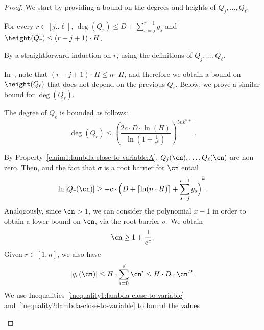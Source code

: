 \begin{proof}
    We start by providing a bound on the degrees and heights
    of $Q_j,\dots,Q_\ell$:
    \begin{claim}\label{claim2:lambda-close-to-variable}
      For every $r \in [j..\ell]$,
      $\deg(Q_r) \leq D + \sum_{s=j}^{r-1} g_s$
      and $\height(Q_r) \leq (r-j+1) \cdot H$.
    \end{claim}
    \begin{claimproof}
      By a straightforward induction on $r$, using the definitions of
      $Q_j,\dots,Q_\ell$.
    \end{claimproof}
    In~,
    note that $(r-j+1) \cdot H \leq n \cdot H$, and therefore we obtain a bound on $\height(Q_\ell)$ that does not depend on the previous $Q_r$. 
    Below, we prove a similar bound for $\deg(Q_\ell)$. 
      \begin{claim}\label{claim3:lambda-close-to-variable}
        The degree of $Q_\ell$ is bounded as follows:
        \[ 
          \deg(Q_\ell) \leq {\left(\frac{2c \cdot D \cdot \ln(H)}{\ln(1 + \frac{1}{e^c})}\right)}^{5nk^{n+1}}.
        \]
      \end{claim}
      \begin{claimproof}
        By Property~\ref{claim1:lambda-close-to-variable:A},
        $Q_j(\cn),\dots,Q_\ell(\cn)$ are non-zero.
        Then, 
        and the fact that $\sigma$ is a root barrier for $\cn$ entail
        \begin{equation}
          \label{inequality1:lambda-close-to-variable}
          \ln \abs{Q_r(\cn)} \geq - c \cdot {\Big(D + \ceil{\ln(n \cdot H)} +
          \sum_{s=j}^{r-1} g_s \Big)}^k.
        \end{equation}
        Analogously, since $\cn > 1$, we can consider the polynomial $x - 1$ in order to obtain a lower bound on $\cn$, via the root barrier $\sigma$. We obtain 
        \begin{equation}
          \label{inequality1:lower-bound-cn}
          \cn \geq 1 + \frac{1}{e^c}.
        \end{equation}
        Given $r \in [1,n]$, we also have
        \begin{equation}
          \label{inequality2:lambda-close-to-variable}
          \abs{q_r(\cn)} \leq 
            H \cdot \sum_{i=0}^d \cn^i \leq H \cdot D \cdot \cn^{D}.
        \end{equation}
        We use Inequalities~\eqref{inequality1:lambda-close-to-variable}
        and~\eqref{inequality2:lambda-close-to-variable} to bound the values

\end{claimproof}
\end{proof}

